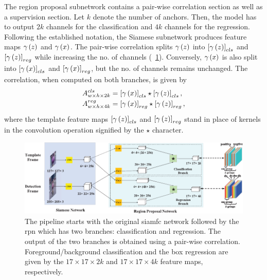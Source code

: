 The region proposal subnetwork contains a pair-wise correlation section as well as a supervision section. Let $k$ denote the number of anchors. Then, the model has to output $2k$ channels for the classification and $4k$ channels for the regression. Following the established notation, the Siamese subnetwork produces feature maps ${\gamma} \left( z \right)$ and ${\gamma} \left( x \right)$. The pair-wise correlation splits ${\gamma} \left( z \right)$ into $\left[ {{\gamma} \left( z \right)} \right]_{cls}$ and $\left[ {{\gamma} \left( z \right)} \right]_{reg}$ while increasing the no. of channels (\figtext{}~\ref{fig:SiamRPNNetArchitecture}). Conversely, ${\gamma} \left( x \right)$ is also split into $\left[ {{\gamma} \left( x \right)} \right]_{cls}$ and $\left[ {{\gamma} \left( x \right)} \right]_{reg}$, but the no. of channels remains unchanged. The correlation, when computed on both branches, is given by
\begin{equation}
    \begin{aligned}
        {A}_{w \times h \times 2k}^{cls} & =
        \left[ {{\gamma} \left( x \right)} \right]_{cls} \star \left[ {{\gamma} \left( z \right)} \right]_{cls}, \\
        {A}_{w \times h \times 4k}^{reg} & =
        \left[ {{\gamma} \left( x \right)} \right]_{reg} \star \left[ {{\gamma} \left( z \right)} \right]_{reg},
    \end{aligned}
\end{equation}
where the template feature maps $\left[ {{\gamma} \left( z \right)} \right]_{cls}$ and $\left[ {{\gamma} \left( z \right)} \right]_{reg}$ stand in place of kernels in the convolution operation signified by the $\star$ character.

\begin{figure}[t]
    \centerline{\includegraphics[width=\linewidth]{figures/theoretical_foundations/siam_rpn_architecture.pdf}}
    \caption[\Gls{siamrpn} architecture]{The pipeline starts with the original \gls{siamfc} network followed by the \gls{rpn} which has two branches: classification and regression. The output of the two branches is obtained using a pair-wise correlation. Foreground/background classification and the box regression are given by the $17 \times 17 \times 2k$ and $17 \times 17 \times 4k$ feature maps, respectively. }
    \label{fig:SiamRPNNetArchitecture}
\end{figure}

